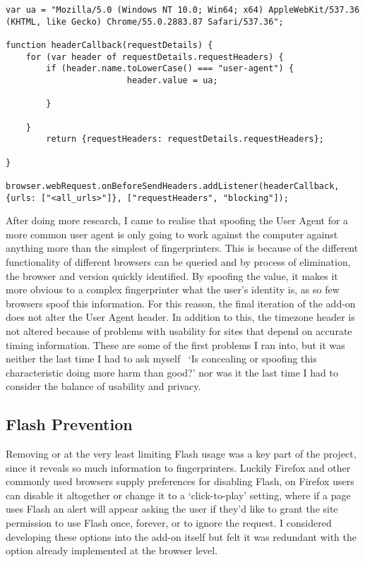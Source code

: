 \begin{lstlisting}[caption={The callback used to change the User Agent header}, label={lst:user-agent}]
var ua = "Mozilla/5.0 (Windows NT 10.0; Win64; x64) AppleWebKit/537.36 (KHTML, like Gecko) Chrome/55.0.2883.87 Safari/537.36";

function headerCallback(requestDetails) {
    for (var header of requestDetails.requestHeaders) {
        if (header.name.toLowerCase() === "user-agent") {
                        header.value = ua;
                                
        }
            
    }
        return {requestHeaders: requestDetails.requestHeaders};

}

browser.webRequest.onBeforeSendHeaders.addListener(headerCallback, {urls: ["<all_urls>"]}, ["requestHeaders", "blocking"]);
\end{lstlisting}

After doing more research, I came to realise that spoofing the User Agent for a more common user agent is only going to work against the computer against anything more than the simplest of fingerprinters.
This is because of the different functionality of different browsers can be queried and by process of elimination, the browser and version quickly identified.
By spoofing the value, it makes it more obvious to a complex fingerprinter what the user's identity is, as so few browsers spoof this information.
For this reason, the final iteration of the add-on does not alter the User Agent header.
In addition to this, the timezone header is not altered because of problems with usability for sites that depend on accurate timing information.
These are some of the first problems I ran into, but it was neither the last time I had to ask myself ~`Is concealing or spoofing this characteristic doing more harm than good?' nor was it the last time I had to consider the balance of usability and privacy.

\subsection{Flash Prevention}

Removing or at the very least limiting Flash usage was a key part of the project, since it reveals so much information to fingerprinters.
Luckily Firefox and other commonly used browsers supply preferences for disabling Flash, on Firefox users can disable it altogether or change it to a `click-to-play' setting, where if a page uses Flash an alert will appear asking the user if they'd like to grant the site permission to use Flash once, forever, or to ignore the request.
I considered developing these options into the add-on itself but felt it was redundant with the option already implemented at the browser level.

